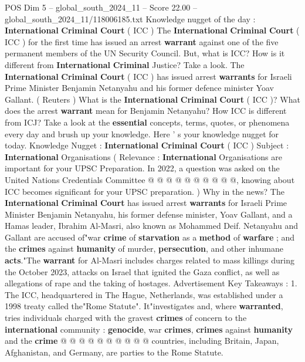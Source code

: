 \begin{textsample}{POS Dim 5 – global\_south\_2024\_11 – Score 22.00 – global\_south\_2024\_11/118006185.txt}  \label{ex:f5_pos_022}
Knowledge nugget of the day : \textbf{International} \textbf{Criminal} \textbf{Court} ( ICC ) The \textbf{International} \textbf{Criminal} \textbf{Court} ( ICC ) for the first time has issued an arrest \textbf{warrant} against one of the five permanent members of the UN Security Council.
But, what is ICC?
How is it different from \textbf{International} \textbf{Criminal} Justice?
Take a look.
The \textbf{International} \textbf{Criminal} \textbf{Court} ( ICC ) has issued arrest \textbf{warrants} for Israeli Prime Minister Benjamin Netanyahu and his former defence minister Yoav Gallant. ( Reuters ) What is the \textbf{International} \textbf{Criminal} \textbf{Court} ( ICC )?
What does the arrest \textbf{warrant} mean for Benjamin Netanyahu?
How ICC is different from ICJ?
Take a look at the \textbf{essential} concepts, terms, quotes, or phenomena every day and brush up your knowledge.
Here ' s your knowledge nugget for today.
Knowledge Nugget : \textbf{International} \textbf{Criminal} \textbf{Court} ( ICC ) Subject : \textbf{International} Organisations ( Relevance : \textbf{International} Organisations are important for your UPSC Preparation.
In 2022, a question was asked on the United Nations Credentials Committee @ @ @ @ @ @ @ @ @ @, knowing about ICC becomes significant for your UPSC preparation. ) Why in the news?
The \textbf{International} \textbf{Criminal} \textbf{Court} has issued arrest \textbf{warrants} for Israeli Prime Minister Benjamin Netanyahu, his former defense minister, Yoav Gallant, and a Hamas leader, Ibrahim Al-Masri, also known as Mohammed Deif.
Netanyahu and Gallant are accused of"war \textbf{crime} of \textbf{starvation} as a \textbf{method} of \textbf{warfare} ; and the \textbf{crimes} against \textbf{humanity} of murder, \textbf{persecution}, and other inhumane \textbf{acts}."The \textbf{warrant} for Al-Masri includes charges related to mass killings during the October 2023, attacks on Israel that ignited the Gaza conflict, as well as allegations of rape and the taking of hostages.
Advertisement Key Takeaways : 1.
The ICC, headquartered in The Hague, Netherlands, was established under a 1998 treaty called the"Rome Statute".
It"investigates and, where \textbf{warranted}, tries individuals charged with the gravest \textbf{crimes} of concern to the \textbf{international} community : \textbf{genocide}, war \textbf{crimes}, \textbf{crimes} against \textbf{humanity} and the \textbf{crime} @ @ @ @ @ @ @ @ @ @ countries, including Britain, Japan, Afghanistan, and Germany, are parties to the Rome Statute.

\end{textsample}
